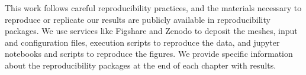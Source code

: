 This work follows careful reproducibility practices, and the materials necessary to reproduce or replicate our results are publicly available in 
reproducibility packages.  We use services like Figshare and Zenodo to deposit the meshes, input and configuration files, execution scripts 
to reproduce the data, and jupyter notebooks and scripts to reproduce the figures. We provide specific information about the reproducibility packages 
at the end of each chapter with results. 
